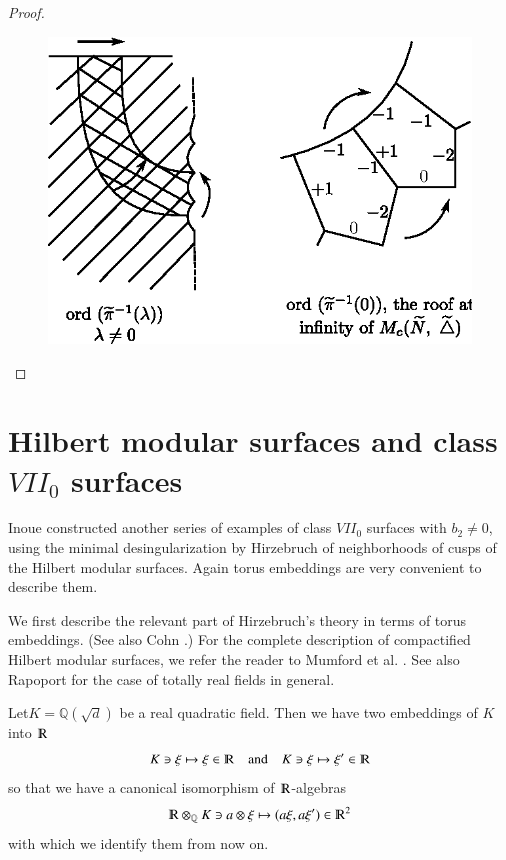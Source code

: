 \begin{proof}
\begin{figure}[H]
\end{figure}
\begin{figure}[H]
\centering 
\includegraphics{vol58-fig/fig58-79.eps} 
\end{figure}
\end{proof}\pageoriginale


  \section{Hilbert modular surfaces and class $VII_0$
    surfaces}\label{chap2:sec15}  
  
   Inoue \cite{keyI3} constructed another series of examples of class
   $VII_0$ surfaces with  $b_2 \neq 0$, using the minimal
   desingularization by  Hirzebruch \cite{keyH4} of neighborhoods of cusps
   of the Hilbert modular surfaces. Again torus embeddings are very
   convenient to describe them.  
   
   We first describe the relevant part of Hirzebruch's  theory in
   terms of torus embeddings. (See also Cohn \cite{keyC2}.) For  the
   complete description of compactified Hilbert modular surfaces, we
   refer the reader to Mumford et al. \cite[Chap. \ref{chap1},
     \S. \ref{chap1:sec5}]{keySC}. See 
   also Rapoport \cite{keyR1} for the case of totally  real fields in
   general.  
   
  Let\pageoriginale $K= \mathbb{Q}(\sqrt{d})$  be a real quadratic
  field. Then  we have two embeddings of $K$ into $\varmathbb{R}$   
    $$
   K\ni \xi \mapsto \xi  \in \varmathbb{R} \quad \text{and} \quad
   K\ni \xi \mapsto \xi' \in \varmathbb{R}  
  $$
    so that we have a canonical isomorphism of
    $\varmathbb{R}$-algebras  
  $$
    \varmathbb{R} \otimes_{\mathbb{Q}} K \ni a \otimes \xi \mapsto (a
    \xi, a \xi ') \in   \varmathbb{R}^2 
  $$
    with which we identify them from now on.
  
